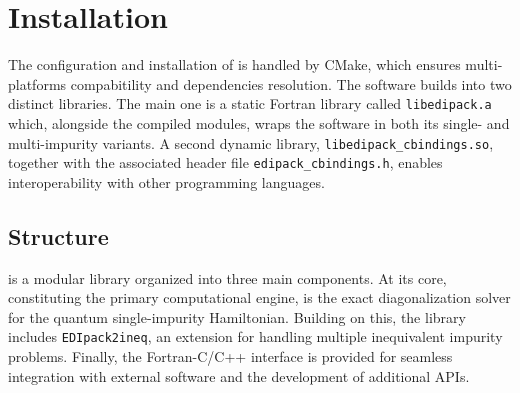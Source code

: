 \documentclass[edipack_sp.tex]{subfiles}
\begin{document}
\section{Installation}\label{SecInstall}
The configuration and installation of \NAME is handled by CMake, which ensures
multi-platforms compabitility and dependencies resolution.  
The software builds into two distinct libraries.
The main one is a static Fortran library called {\tt  libedipack.a} which, alongside the compiled
modules, wraps the \NAME software in both its single- and multi-impurity variants.
A second dynamic library, {\tt libedipack\_cbindings.so}, together with the associated header
file {\tt edipack\_cbindings.h}, enables interoperability with other programming languages.  


\subsection{Structure}\label{sSecInstallStructure}
\NAME is a modular library organized into three main components. At its 
core, constituting the primary computational engine, 
is the exact diagonalization solver for the quantum single-impurity Hamiltonian.
Building on this, the library includes 
{\tt EDIpack2ineq}, an extension for handling multiple inequivalent 
impurity problems. Finally, the Fortran-C/C++ interface is provided for 
seamless integration with external software and the development of 
additional APIs.
\end{document}
